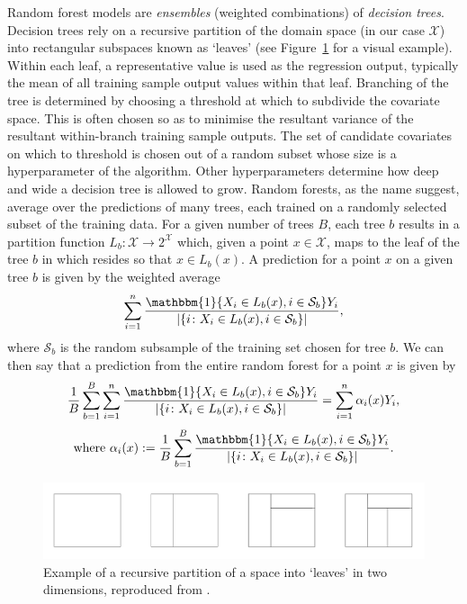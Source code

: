\documentclass[../thesis.tex]{subfiles}
\begin{document}
Random forest models are \emph{ensembles} (weighted combinations) of \emph{decision trees}. Decision trees rely on a recursive partition of the domain space (in our case $\mathcal{X}$) into rectangular subspaces known as `leaves' (see Figure~\ref{fig:recursive} for a visual example). Within each leaf, a representative value is used as the regression output, typically the mean of all training sample output values within that leaf. Branching of the tree is determined by choosing a threshold at which to subdivide the covariate space. This is often chosen so as to minimise the resultant variance of the resultant within-branch training sample outputs. The set of candidate covariates on which to threshold is chosen out of a random subset whose size is a hyperparameter of the algorithm. Other hyperparameters determine how deep and wide a decision tree is allowed to grow. Random forests, as the name suggest, average over the predictions of many trees, each trained on a randomly selected subset of the training data. For a given number of trees $B$, each tree $b$ results in a partition function $L_b \colon \mathcal{X} \rightarrow 2^{\mathcal{X}}$ which, given a point $x \in \mathcal{X}$, maps to the leaf of the tree $b$ in which resides so that $x \in L_b(x)$. A prediction for a point $x$ on a given tree $b$ is given by the weighted average
\[ \sum_{i=1}^{n} \frac{\mathbbm{1} \{X_i \in L_b(x), i \in \mathcal{S}_b\}Y_i}{|\{i \colon X_i \in L_b(x), i \in \mathcal{S}_b\}|},\]
where $\mathcal{S}_b$ is the random subsample of the training set chosen for tree $b$. We can then say that a prediction from the entire random forest for a point $x$ is given by 
\[\frac{1}{B}\sum_{b=1}^{B} \sum_{i=1}^{n} \frac{\mathbbm{1} \{X_i \in L_b(x), i \in \mathcal{S}_b\}Y_i}{|\{i \colon X_i \in L_b(x), i \in \mathcal{S}_b\}|} = \sum_{i=1}^{n} \alpha_i(x) Y_i, \]
\[ \text{where} \ \alpha_i(x) := \frac{1}{B} \sum_{b=1}^B \frac{\mathbbm{1} \{X_i \in L_b(x), i \in \mathcal{S}_b\}Y_i}{|\{i \colon X_i \in L_b(x), i \in \mathcal{S}_b\}|}.\]
\begin{figure}
    \centering
    \includegraphics[width=\textwidth]{figures/chapter4/recursive.png}
    \caption{Example of a recursive partition of a space into `leaves' in two dimensions, reproduced from \citet{reeve_adaptive_2021}.}
    \label{fig:recursive}
\end{figure}
\end{document}
